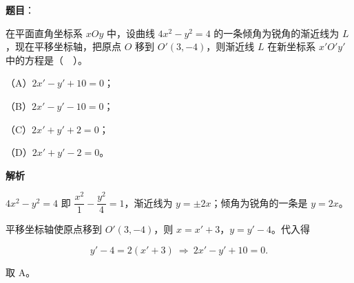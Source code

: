 \begin{answer}

\textbf{题目}：

在平面直角坐标系 $xOy$ 中，设曲线 $4x^{2}-y^{2}=4$ 的一条倾角为锐角的渐近线为 $L$，现在平移坐标轴，把原点 $O$ 移到 $O'(3,-4)$，则渐近线 $L$ 在新坐标系 $x'O'y'$ 中的方程是（　）。

（A）$2x'-y'+10=0$；

（B）$2x'-y'-10=0$；

（C）$2x'+y'+2=0$；

（D）$2x'+y'-2=0$。

\textbf{解析}

$4x^{2}-y^{2}=4$ 即 $\dfrac{x^{2}}{1}-\dfrac{y^{2}}{4}=1$，渐近线为 $y=\pm 2x$；倾角为锐角的一条是 $y=2x$。

平移坐标轴使原点移到 $O'(3,-4)$，则 $x=x'+3$，$y=y'-4$。代入得

\nopagebreak[4]
\[
y'-4=2(x'+3)\ \Longrightarrow\ 2x'-y'+10=0.
\]

取 A。


\end{answer}


